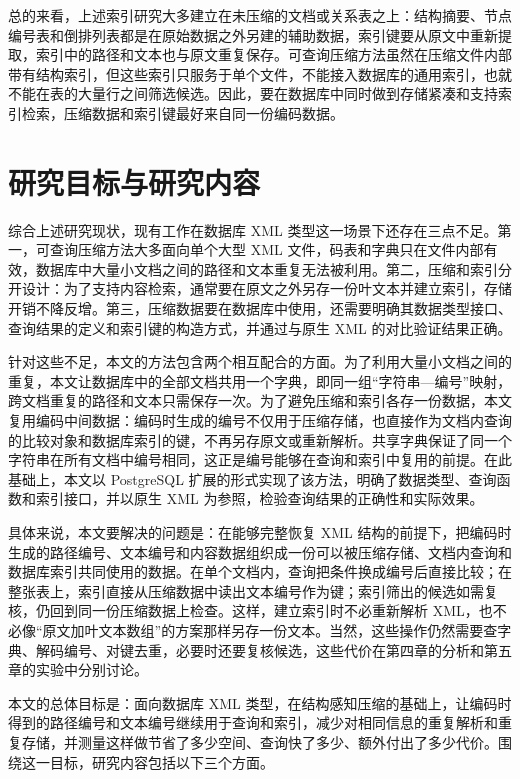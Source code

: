 总的来看，上述索引研究大多建立在未压缩的文档或关系表之上：结构摘要、节点编号表和倒排列表都是在原始数据之外另建的辅助数据，索引键要从原文中重新提取，索引中的路径和文本也与原文重复保存。可查询压缩方法虽然在压缩文件内部带有结构索引，但这些索引只服务于单个文件，不能接入数据库的通用索引，也就不能在表的大量行之间筛选候选。因此，要在数据库中同时做到存储紧凑和支持索引检索，压缩数据和索引键最好来自同一份编码数据。

\section{研究目标与研究内容}

综合上述研究现状，现有工作在数据库 XML 类型这一场景下还存在三点不足。第一，可查询压缩方法大多面向单个大型 XML 文件，码表和字典只在文件内部有效，数据库中大量小文档之间的路径和文本重复无法被利用。第二，压缩和索引分开设计：为了支持内容检索，通常要在原文之外另存一份叶文本并建立索引，存储开销不降反增。第三，压缩数据要在数据库中使用，还需要明确其数据类型接口、查询结果的定义和索引键的构造方式，并通过与原生 XML 的对比验证结果正确。

针对这些不足，本文的方法包含两个相互配合的方面。为了利用大量小文档之间的重复，本文让数据库中的全部文档共用一个字典，即同一组“字符串—编号”映射，跨文档重复的路径和文本只需保存一次。为了避免压缩和索引各存一份数据，本文复用编码中间数据：编码时生成的编号不仅用于压缩存储，也直接作为文档内查询的比较对象和数据库索引的键，不再另存原文或重新解析。共享字典保证了同一个字符串在所有文档中编号相同，这正是编号能够在查询和索引中复用的前提。在此基础上，本文以 PostgreSQL 扩展的形式实现了该方法，明确了数据类型、查询函数和索引接口，并以原生 XML 为参照，检验查询结果的正确性和实际效果。

具体来说，本文要解决的问题是：在能够完整恢复 XML 结构的前提下，把编码时生成的路径编号、文本编号和内容数据组织成一份可以被压缩存储、文档内查询和数据库索引共同使用的数据。在单个文档内，查询把条件换成编号后直接比较；在整张表上，索引直接从压缩数据中读出文本编号作为键；索引筛出的候选如需复核，仍回到同一份压缩数据上检查。这样，建立索引时不必重新解析 XML，也不必像“原文加叶文本数组”的方案那样另存一份文本。当然，这些操作仍然需要查字典、解码编号、对键去重，必要时还要复核候选，这些代价在第四章的分析和第五章的实验中分别讨论。

本文的总体目标是：面向数据库 XML 类型，在结构感知压缩的基础上，让编码时得到的路径编号和文本编号继续用于查询和索引，减少对相同信息的重复解析和重复存储，并测量这样做节省了多少空间、查询快了多少、额外付出了多少代价。围绕这一目标，研究内容包括以下三个方面。

